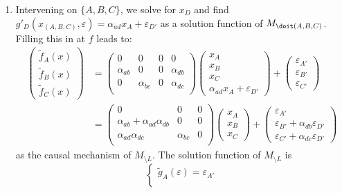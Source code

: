 \begin{enumerate}
\begin{gradedsolution}
\begin{enumerate}
	\item Intervening on $\{A,B,C\}$, we solve for $x_D$ and find $g'_D(x_{(A, B, C)}, \varepsilon)=\alpha_{ad} x_A + \varepsilon_{D'}$ as a solution function of $M_{\doit(A, B, C)}$. Filling this in at $f$ leads to:
	\begin{align*}
		\begin{pmatrix}
			\tilde{f}_A(x) \\ \tilde{f}_B(x) \\ \tilde{f}_C(x)
		\end{pmatrix}
		&= 
		\begin{pmatrix}
			0 & 0 & 0 & 0 \\
			\alpha_{ab} & 0 & 0 & \alpha_{db} \\
			0 & \alpha_{bc} & 0 & \alpha_{dc} \\
		\end{pmatrix}
		\begin{pmatrix}
			x_A \\ x_B \\ x_C \\ \alpha_{ad} x_A + \varepsilon_{D'}
		\end{pmatrix}
		+
		\begin{pmatrix}
			\varepsilon_{A'} \\ \varepsilon_{B'} \\ \varepsilon_{C'}
		\end{pmatrix} \\
		&= 
		\begin{pmatrix}
			0 & 0 & 0 \\
			\alpha_{ab}+\alpha_{ad}\alpha_{db} & 0 & 0 \\
			\alpha_{ad}\alpha_{dc} & \alpha_{bc} & 0 \\
		\end{pmatrix}
		\begin{pmatrix}
			x_A \\ x_B \\ x_C
		\end{pmatrix}
		+
		\begin{pmatrix}
			\varepsilon_{A'} \\ \varepsilon_{B'} +\alpha_{db}\varepsilon_{D'}\\ \varepsilon_{C'} + \alpha_{dc}\varepsilon_{D'}
		\end{pmatrix}
	\end{align*}
	as the causal mechanism of $M_{\setminus L}$. The solution function of $M_{\setminus L}$ is
	\[\begin{cases}
		\tilde{g}_A(\varepsilon) = \varepsilon_{A'} \\

\end{cases}\]
\end{enumerate}
\end{gradedsolution}
\end{enumerate}
